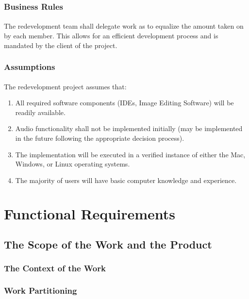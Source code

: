 \documentclass[12pt, titlepage]{article}
\begin{document}
\subsubsection{Business Rules}
\paragraph{}
The redevelopment team shall delegate work as to equalize the amount taken on by each member. This allows for an efficient development process and is mandated by the client of the project.

\subsubsection{Assumptions}
\paragraph{}
The redevelopment project assumes that:
\begin{enumerate}[i]
\item All required software components (IDEs, Image Editing Software) will be readily available.
\item Audio functionality shall not be implemented initially (may be implemented in the future following the appropriate decision process).
\item The implementation will be executed in a verified instance of either the Mac, Windows, or Linux operating systems.
\item The majority of users will have basic computer knowledge and experience.
\end{enumerate}

\section{Functional Requirements}

\subsection{The Scope of the Work and the Product}

\subsubsection{The Context of the Work}

\subsubsection{Work Partitioning}
\end{document}
